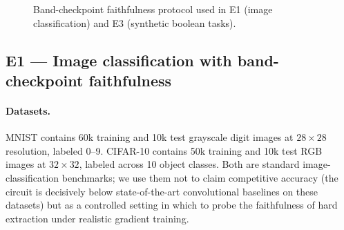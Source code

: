 \documentclass{article}
\begin{document}
\begin{figure}[H]
\centering
{}
\caption{Band-checkpoint faithfulness protocol used in E1 (image classification) and E3 (synthetic boolean tasks).}
\label{fig:band}
\end{figure}

\subsection{E1 --- Image classification with band-checkpoint faithfulness}
\label{sec:e1}

\paragraph{Datasets.}
MNIST contains 60k training and 10k test grayscale digit images at $28 \times 28$ resolution, labeled 0--9.
CIFAR-10 contains 50k training and 10k test RGB images at $32 \times 32$, labeled across 10 object classes.
Both are standard image-classification benchmarks; we use them not to claim competitive accuracy (the circuit is decisively below state-of-the-art convolutional baselines on these datasets) but as a controlled setting in which to probe the faithfulness of hard extraction under realistic gradient training.
\end{document}
